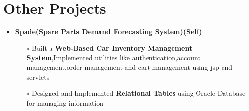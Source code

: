 \documentclass[10.8pt, a4paper]{extarticle}
\newcommand{\shorterSection}[1]{\vspace{-10pt}\section{#1}}
\begin{document}
\begin{itemize}
	


\medskip

\end{itemize}
\vspace{-2mm}


\shorterSection{Other Projects}
\vspace{-2pt}
\begin{itemize}
     \item\href{https://github.com/jeetsarangi/spade}{\textbf{Spade(Spare Parts Demand Forecasting System)(Self)}}\hfill
    \\[-0.6cm]
    \begin{itemize}
	      \item [$\circ$]Built a \textbf {Web-Based Car Inventory Management System},Implemented utilities like authentication,account management,order management and cart management using jsp and servlets\\[-0.6cm]
	      \item [$\circ$] Designed and Implemented \textbf {Relational Tables} using Oracle Database for managing information
	\end{itemize}
	\end{itemize}
\medskip
\end{document}

